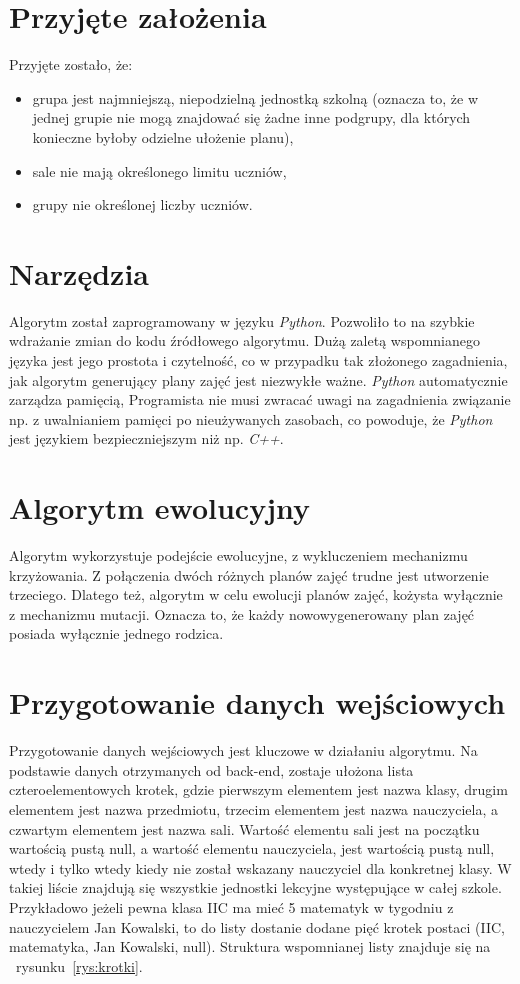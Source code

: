 \section{Przyjęte założenia}
Przyjęte zostało, że: 
\begin{itemize}
	\item grupa jest najmniejszą, niepodzielną jednostką szkolną (oznacza to, że w jednej grupie nie mogą znajdować się żadne inne podgrupy, dla których konieczne byłoby odzielne ułożenie planu),
	\item sale nie mają określonego limitu uczniów,
	\item grupy nie określonej liczby uczniów.
\end{itemize} 


\section{Narzędzia}
Algorytm został zaprogramowany w języku \textit{Python}. Pozwoliło to na szybkie wdrażanie zmian do kodu źródłowego algorytmu. Dużą zaletą wspomnianego języka jest jego prostota i czytelność, co w przypadku tak złożonego zagadnienia, jak algorytm generujący plany zajęć jest niezwykłe ważne. \textit{Python} automatycznie zarządza pamięcią, Programista nie musi zwracać uwagi na zagadnienia związanie np. z uwalnianiem pamięci po nieużywanych zasobach, co powoduje, że \textit{Python} jest językiem bezpieczniejszym niż np. \textit{C++}.

\section{Algorytm ewolucyjny}
Algorytm wykorzystuje podejście ewolucyjne, z wykluczeniem mechanizmu krzyżowania. Z połączenia dwóch różnych planów zajęć trudne jest utworzenie trzeciego. Dlatego też, algorytm w celu ewolucji planów zajęć, kożysta wyłącznie z mechanizmu mutacji. Oznacza to, że każdy nowowygenerowany plan zajęć posiada wyłącznie jednego rodzica.

\section{Przygotowanie danych wejściowych}
    
    Przygotowanie danych wejściowych jest kluczowe w działaniu algorytmu. Na podstawie danych otrzymanych od back-end, zostaje ułożona lista czteroelementowych krotek, gdzie pierwszym elementem jest nazwa klasy, drugim elementem jest nazwa przedmiotu, trzecim elementem jest nazwa nauczyciela, a czwartym elementem jest nazwa sali. Wartość elementu sali jest na początku wartością pustą null, a wartość elementu nauczyciela, jest wartością pustą null, wtedy i tylko wtedy kiedy nie został wskazany nauczyciel dla konkretnej klasy. W takiej liście znajdują się wszystkie jednostki lekcyjne występujące w całej szkole. Przykładowo jeżeli pewna klasa IIC ma mieć 5 matematyk w tygodniu z nauczycielem Jan Kowalski, to do listy dostanie dodane pięć krotek postaci (IIC, matematyka, Jan Kowalski, null). Struktura wspomnianej listy znajduje się na ~rysunku~\ref{rys:krotki}.



